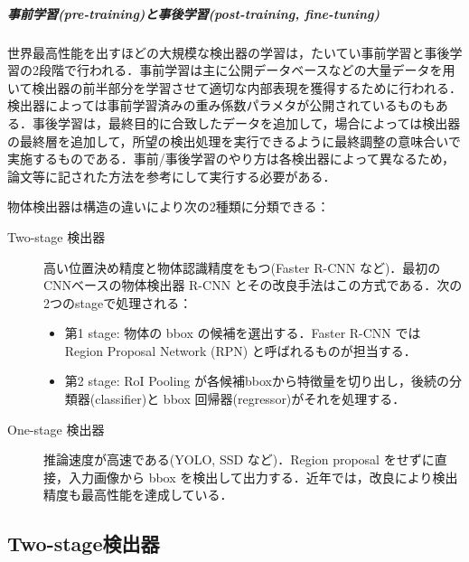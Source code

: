 \documentclass[twocolumn]{jsarticle} %
\begin{document}
\subparagraph{事前学習(pre-training)と事後学習(post-training, fine-tuning)}世界最高性能を出すほどの大規模な検出器の学習は，たいてい事前学習と事後学習の2段階で行われる．事前学習は主に公開データベースなどの大量データを用いて検出器の前半部分を学習させて適切な内部表現を獲得するために行われる．検出器によっては事前学習済みの重み係数パラメタが公開されているものもある．事後学習は，最終目的に合致したデータを追加して，場合によっては検出器の最終層を追加して，所望の検出処理を実行できるように最終調整の意味合いで実施するものである．事前/事後学習のやり方は各検出器によって異なるため，論文等に記された方法を参考にして実行する必要がある．

物体検出器は構造の違いにより次の2種類に分類できる\cite{JZLYLFQ19}：
\begin{description}
    \item[Two-stage 検出器] 高い位置決め精度と物体認識精度をもつ(Faster R-CNN など)．最初のCNNベースの物体検出器 R-CNN とその改良手法はこの方式である．次の2つのstageで処理される：
    \begin{itemize}
        \item 第1 stage: 物体の bbox の候補を選出する．Faster R-CNN では Region Proposal Network (RPN) と呼ばれるものが担当する．
        \item 第2 stage: RoI Pooling が各候補bboxから特徴量を切り出し，後続の分類器(classifier)と bbox 回帰器(regressor)がそれを処理する．
    \end{itemize}
    \item[One-stage 検出器] 推論速度が高速である(YOLO\cite{RedFar18,BWL20}, SSD\cite{LAESRFB16} など)．Region proposal をせずに直接，入力画像から bbox を検出して出力する．近年では，改良により検出精度も最高性能を達成している．
\end{description}

\subsection{Two-stage検出器}
\end{document}
